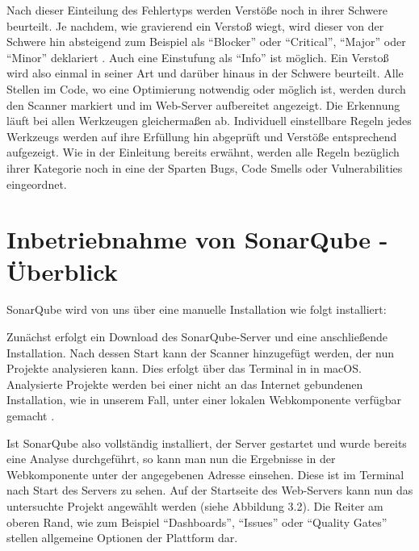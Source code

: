 Nach dieser Einteilung des Fehlertyps werden Verstöße noch in ihrer Schwere beurteilt. Je nachdem, wie gravierend ein Verstoß wiegt, wird dieser von der Schwere hin absteigend zum Beispiel als \enquote{Blocker} oder \enquote{Critical}, \enquote{Major} oder \enquote{Minor} deklariert \autocite[Vgl.][]{MetricDefinitions}. Auch eine Einstufung als \enquote{Info} ist möglich. Ein Verstoß wird also einmal in seiner Art und darüber hinaus in der Schwere beurteilt.
Alle Stellen im Code, wo eine Optimierung notwendig oder möglich ist, werden durch den Scanner markiert und im Web-Server aufbereitet angezeigt. Die Erkennung läuft bei allen Werkzeugen gleichermaßen ab. Individuell einstellbare Regeln jedes Werkzeugs werden auf ihre Erfüllung hin abgeprüft und Verstöße entsprechend aufgezeigt. Wie in der Einleitung bereits erwähnt, werden alle Regeln bezüglich ihrer Kategorie noch in eine der Sparten Bugs, Code Smells oder Vulnerabilities eingeordnet.


\section{Inbetriebnahme von SonarQube - Überblick}

SonarQube wird von uns über eine manuelle Installation wie folgt installiert:

Zunächst erfolgt ein Download des SonarQube-Server und eine anschließende Installation. Nach dessen Start kann der Scanner hinzugefügt werden, der nun Projekte analysieren kann. Dies erfolgt über das Terminal in in macOS. Analysierte Projekte werden bei einer nicht an das Internet gebundenen Installation, wie in unserem Fall, unter einer lokalen Webkomponente verfügbar gemacht \autocite[Vgl.][]{GetStarted}.

Ist SonarQube also vollständig installiert, der Server gestartet und wurde bereits eine Analyse durchgeführt, so kann man nun die Ergebnisse in der Webkomponente unter der angegebenen Adresse einsehen. Diese ist im Terminal nach Start des Servers zu sehen. Auf der Startseite des Web-Servers kann nun das untersuchte Projekt angewählt werden (siehe Abbildung 3.2). Die Reiter am oberen Rand, wie zum Beispiel \enquote{Dashboards}, \enquote{Issues} oder \enquote{Quality Gates} stellen allgemeine Optionen der Plattform dar.



